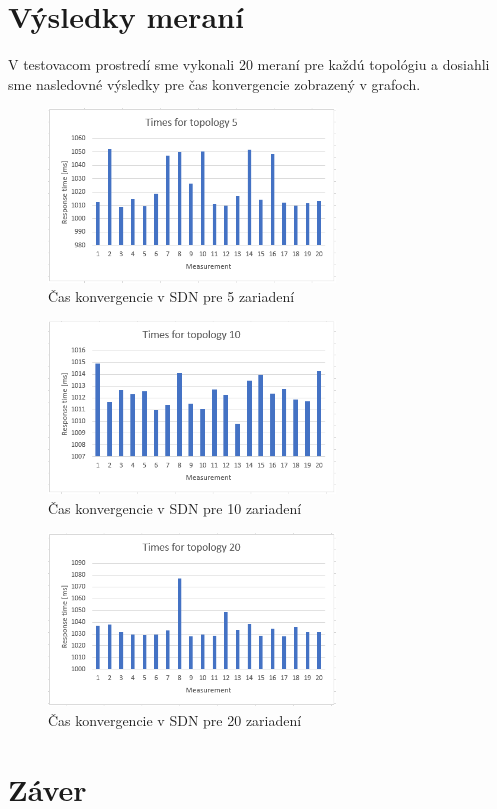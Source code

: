 \documentclass[conference]{IEEEtran}
\begin{document}
\section{Výsledky meraní}

V testovacom prostredí sme vykonali 20 meraní pre každú topológiu a dosiahli sme nasledovné výsledky pre čas konvergencie zobrazený v grafoch.

\begin{figure}[h!]
\centering
\includegraphics[width=3in]{../img/graph5}
\caption{Čas konvergencie v SDN pre 5 zariadení}
\end{figure}

\begin{figure}[h!]
\centering
\includegraphics[width=3in]{../img/graph10}
\caption{Čas konvergencie v SDN pre 10 zariadení}
\end{figure}

\begin{figure}[h!]
\centering
\includegraphics[width=3in]{../img/graph20}
\caption{Čas konvergencie v SDN pre 20 zariadení}
\end{figure}


\section{Záver}
\end{document}
